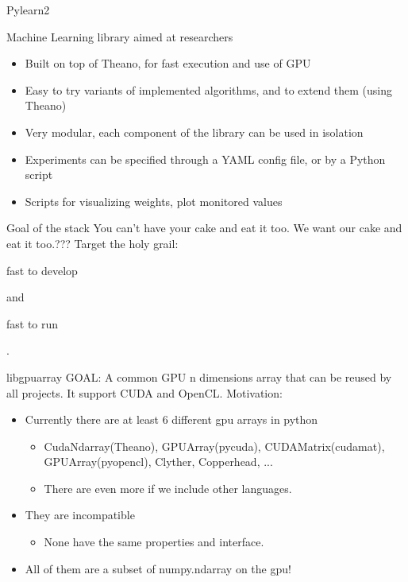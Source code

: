 \documentclass[utf8x,xcolor=pdftex,dvipsnames,table]{beamer}
\begin{document}
\begin{frame}{Pylearn2}

  Machine Learning library aimed at researchers

  \begin{itemize}
    \item Built on top of Theano, for fast execution and use of GPU
    \item Easy to try variants of implemented algorithms, and to extend them (using Theano)
    \item Very modular, each component of the library can be used in isolation
    \item Experiments can be specified through a YAML config file, or by a Python script
    \item Scripts for visualizing weights, plot monitored values
  \end{itemize}
\end{frame}


\begin{frame}{Goal of the stack}
You can't have your cake and eat it too.\newline
We want our cake and eat it too.???\newline
Target the holy grail: \begin{bf}fast to develop\end{bf} and \begin{bf}fast to run\end{bf}.
\end{frame}


\begin{frame}{libgpuarray}
  GOAL: A common GPU n dimensions array that can be reused by all projects. It support CUDA and OpenCL.
  \newline \newline
  Motivation:
  \begin{itemize}
  \item Currently there are at least 6 different gpu arrays in python
    \begin{itemize}
    \item CudaNdarray(Theano), GPUArray(pycuda), CUDAMatrix(cudamat), GPUArray(pyopencl), Clyther, Copperhead, ...
    \item There are even more if we include other languages.
    \end{itemize}
  \item They are incompatible
    \begin{itemize}
    \item None have the same properties and interface.
    \end{itemize}
  \item All of them are a subset of numpy.ndarray on the gpu!
  \end{itemize}
\end{frame}
\end{document}
